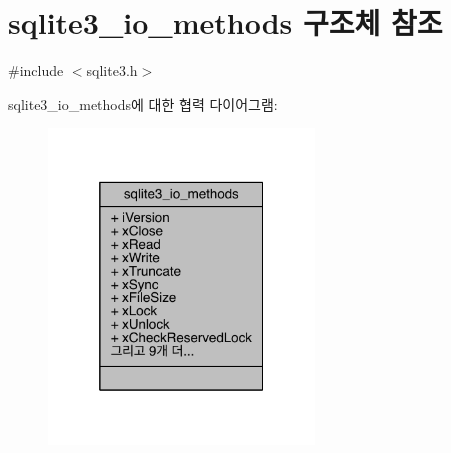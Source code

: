 \hypertarget{structsqlite3__io__methods}{}\section{sqlite3\+\_\+io\+\_\+methods 구조체 참조}
\label{structsqlite3__io__methods}


{\ttfamily \#include $<$sqlite3.\+h$>$}



sqlite3\+\_\+io\+\_\+methods에 대한 협력 다이어그램\+:
\nopagebreak
\begin{figure}[H]
\begin{center}
\leavevmode
\includegraphics[width=200pt]{structsqlite3__io__methods__coll__graph}
\end{center}
\end{figure}
